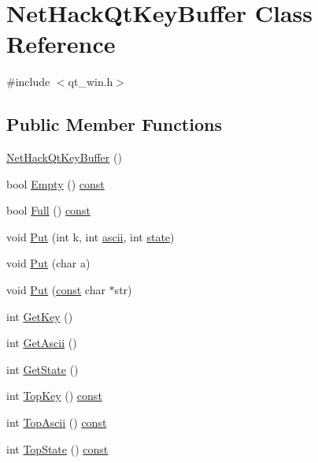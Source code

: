 \hypertarget{classNetHackQtKeyBuffer}{\section{Net\+Hack\+Qt\+Key\+Buffer Class Reference}
\label{classNetHackQtKeyBuffer}
}


{\ttfamily \#include $<$qt\+\_\+win.\+h$>$}

\subsection*{Public Member Functions}
\begin{DoxyCompactItemize}
\item 
\hyperlink{classNetHackQtKeyBuffer_a0d0743da901291e70e842e36f092b38f}{Net\+Hack\+Qt\+Key\+Buffer} ()
\item 
bool \hyperlink{classNetHackQtKeyBuffer_afef5db933c06d617afab2262e91c6e86}{Empty} () \hyperlink{tradstdc_8h_a2c212835823e3c54a8ab6d95c652660e}{const} 
\item 
bool \hyperlink{classNetHackQtKeyBuffer_a44e46ed44d9fae7d3076af0e14c2da28}{Full} () \hyperlink{tradstdc_8h_a2c212835823e3c54a8ab6d95c652660e}{const} 
\item 
void \hyperlink{classNetHackQtKeyBuffer_a8e1d90abccfd1897d5f44d844ecd64ea}{Put} (int k, int \hyperlink{classNetHackQtKeyBuffer_a6a287fcfb3c474749b3722fd6ea2804a}{ascii}, int \hyperlink{classNetHackQtKeyBuffer_a1e36092386de6ea377dac2fd8a08beba}{state})
\item 
void \hyperlink{classNetHackQtKeyBuffer_a41b487f1f614d0186439fae6368528bd}{Put} (char a)
\item 
void \hyperlink{classNetHackQtKeyBuffer_a979311db312d3ed3750ddebac5d68500}{Put} (\hyperlink{tradstdc_8h_a2c212835823e3c54a8ab6d95c652660e}{const} char $\ast$str)
\item 
int \hyperlink{classNetHackQtKeyBuffer_a388daff42ece200e839fee37f0c77e83}{Get\+Key} ()
\item 
int \hyperlink{classNetHackQtKeyBuffer_ae449f9bd4bc6d69097f801f7eb230e62}{Get\+Ascii} ()
\item 
int \hyperlink{classNetHackQtKeyBuffer_a852945b5651fa09b6a5340af80268b65}{Get\+State} ()
\item 
int \hyperlink{classNetHackQtKeyBuffer_a3aecd0116881ba50f4ba4b451ff84484}{Top\+Key} () \hyperlink{tradstdc_8h_a2c212835823e3c54a8ab6d95c652660e}{const} 
\item 
int \hyperlink{classNetHackQtKeyBuffer_adb367e5ee4f490f91dc31c84d5608663}{Top\+Ascii} () \hyperlink{tradstdc_8h_a2c212835823e3c54a8ab6d95c652660e}{const} 
\item 
int \hyperlink{classNetHackQtKeyBuffer_a4ef879092e8cb0f127f6b33fca5817a8}{Top\+State} () \hyperlink{tradstdc_8h_a2c212835823e3c54a8ab6d95c652660e}{const} 
\end{DoxyCompactItemize}
